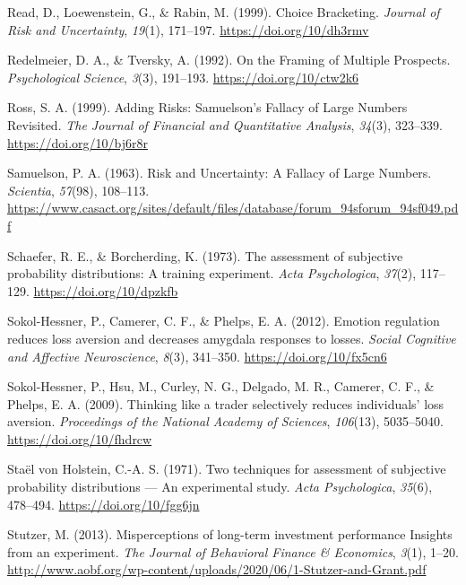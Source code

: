 \documentclass[
  english,
  man, donotrepeattitle,floatsintext]{apa7}
\newlength{\cslhangindent}
\newenvironment{cslreferences}%
  {\setlength{\parindent}{0pt}%
  \everypar{\setlength{\hangindent}{\cslhangindent}}\ignorespaces}%
  {\par}
\theoremstyle{definition}
\theoremstyle{definition}
\theoremstyle{definition}
\theoremstyle{definition}
\theoremstyle{remark}
\begin{document}
\begin{cslreferences}
\leavevmode\hypertarget{ref-read1999}{}%
Read, D., Loewenstein, G., \& Rabin, M. (1999). Choice Bracketing. \emph{Journal of Risk and Uncertainty}, \emph{19}(1), 171--197. \url{https://doi.org/10/dh3rmv}

\leavevmode\hypertarget{ref-redelmeier1992}{}%
Redelmeier, D. A., \& Tversky, A. (1992). On the Framing of Multiple Prospects. \emph{Psychological Science}, \emph{3}(3), 191--193. \url{https://doi.org/10/ctw2k6}

\leavevmode\hypertarget{ref-ross1999}{}%
Ross, S. A. (1999). Adding Risks: Samuelson's Fallacy of Large Numbers Revisited. \emph{The Journal of Financial and Quantitative Analysis}, \emph{34}(3), 323--339. \url{https://doi.org/10/bj6r8r}

\leavevmode\hypertarget{ref-samuelson1963}{}%
Samuelson, P. A. (1963). Risk and Uncertainty: A Fallacy of Large Numbers. \emph{Scientia}, \emph{57}(98), 108--113. \url{https://www.casact.org/sites/default/files/database/forum_94sforum_94sf049.pdf}

\leavevmode\hypertarget{ref-schaefer1973}{}%
Schaefer, R. E., \& Borcherding, K. (1973). The assessment of subjective probability distributions: A training experiment. \emph{Acta Psychologica}, \emph{37}(2), 117--129. \url{https://doi.org/10/dpzkfb}

\leavevmode\hypertarget{ref-sokolhessner2012}{}%
Sokol-Hessner, P., Camerer, C. F., \& Phelps, E. A. (2012). Emotion regulation reduces loss aversion and decreases amygdala responses to losses. \emph{Social Cognitive and Affective Neuroscience}, \emph{8}(3), 341--350. \url{https://doi.org/10/fx5cn6}

\leavevmode\hypertarget{ref-sokolhessner2009}{}%
Sokol-Hessner, P., Hsu, M., Curley, N. G., Delgado, M. R., Camerer, C. F., \& Phelps, E. A. (2009). Thinking like a trader selectively reduces individuals' loss aversion. \emph{Proceedings of the National Academy of Sciences}, \emph{106}(13), 5035--5040. \url{https://doi.org/10/fhdrcw}

\leavevmode\hypertarget{ref-staelvonholstein1971}{}%
Staël von Holstein, C.-A. S. (1971). Two techniques for assessment of subjective probability distributions --- An experimental study. \emph{Acta Psychologica}, \emph{35}(6), 478--494. \url{https://doi.org/10/fgg6jn}

\leavevmode\hypertarget{ref-stutzer2013}{}%
Stutzer, M. (2013). Misperceptions of long-term investment performance Insights from an experiment. \emph{The Journal of Behavioral Finance \& Economics}, \emph{3}(1), 1--20. \url{http://www.aobf.org/wp-content/uploads/2020/06/1-Stutzer-and-Grant.pdf}


\end{cslreferences}
\end{document}
